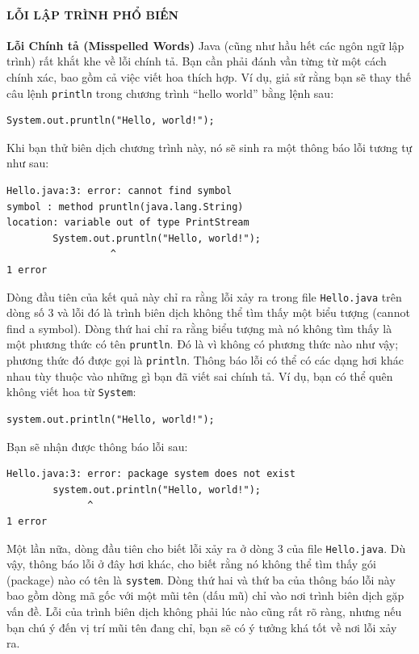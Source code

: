 \paragraph{LỖI LẬP TRÌNH PHỔ
BIẾN}\label{lux1ed7i-lux1eadp-truxecnh-phux1ed5-biux1ebfn-1}

\textbf{Lỗi Chính tả (Misspelled Words)} Java (cũng như hầu hết các ngôn
ngữ lập trình) rất khắt khe về lỗi chính tả. Bạn cần phải đánh vần từng
từ một cách chính xác, bao gồm cả việc viết hoa thích hợp. Ví dụ, giả sử
rằng bạn sẽ thay thế câu lệnh \texttt{println} trong chương trình
``hello world'' bằng lệnh sau:

\begin{verbatim}
System.out.pruntln("Hello, world!");
\end{verbatim}

Khi bạn thử biên dịch chương trình này, nó sẽ sinh ra một thông báo lỗi
tương tự như sau:

\begin{verbatim}
Hello.java:3: error: cannot find symbol
symbol : method pruntln(java.lang.String)
location: variable out of type PrintStream
        System.out.pruntln("Hello, world!");
                  ^
1 error
\end{verbatim}

Dòng đầu tiên của kết quả này chỉ ra rằng lỗi xảy ra trong file
\texttt{Hello.java} trên dòng số 3 và lỗi đó là trình biên dịch không
thể tìm thấy một biểu tượng (cannot find a symbol). Dòng thứ hai chỉ ra
rằng biểu tượng mà nó không tìm thấy là một phương thức có tên
\texttt{pruntln}. Đó là vì không có phương thức nào như vậy; phương thức
đó được gọi là \texttt{println}. Thông báo lỗi có thể có các dạng hơi
khác nhau tùy thuộc vào những gì bạn đã viết sai chính tả. Ví dụ, bạn có
thể quên không viết hoa từ \texttt{System}:

\begin{verbatim}
system.out.println("Hello, world!");
\end{verbatim}

Bạn sẽ nhận được thông báo lỗi sau:

\begin{verbatim}
Hello.java:3: error: package system does not exist
        system.out.println("Hello, world!");
              ^
1 error
\end{verbatim}

Một lần nữa, dòng đầu tiên cho biết lỗi xảy ra ở dòng 3 của file
\texttt{Hello.java}. Dù vậy, thông báo lỗi ở đây hơi khác, cho biết rằng
nó không thể tìm thấy gói (package) nào có tên là \texttt{system}. Dòng
thứ hai và thứ ba của thông báo lỗi này bao gồm dòng mã gốc với một mũi
tên (dấu mũ) chỉ vào nơi trình biên dịch gặp vấn đề. Lỗi của trình biên
dịch không phải lúc nào cũng rất rõ ràng, nhưng nếu bạn chú ý đến vị trí
mũi tên đang chỉ, bạn sẽ có ý tưởng khá tốt về nơi lỗi xảy ra.

